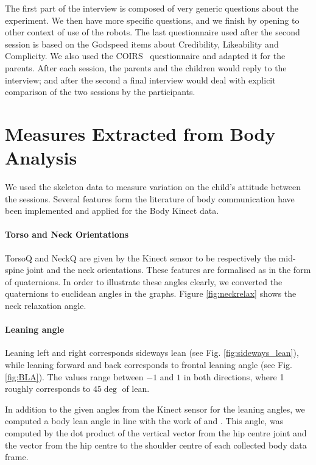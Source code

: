 \documentclass[a4paper,twocolumn]{svjour3}
\begin{document}
The first part of the interview is composed of very generic questions about the experiment. 
We then have more specific questions, and we finish by opening to other context of use of the robots.
The last questionnaire used after the second session is based on the Godspeed\cite{Bartneck2008b} items about Credibility, Likeability and Complicity. 
We also used the COIRS~\cite{Robert2014} questionnaire and adapted it for the parents.
After each session, the parents and the children would reply to the interview; and after the second a final interview would deal with explicit comparison of the two sessions by the participants.

\section{Measures Extracted from Body Analysis}
We used the skeleton data to measure variation on the child's attitude between the sessions.
Several features form the literature of body communication have been implemented and applied for the Body Kinect data.


\paragraph{Torso and Neck Orientations}
TorsoQ and NeckQ are given by the Kinect sensor to be respectively the mid-spine joint and the neck orientations. 
These features are formalised as in the form of quaternions. 
In order to illustrate  these angles clearly, we converted the quaternions to euclidean angles in the graphs.
Figure \ref{fig:neckrelax} shows the neck relaxation angle.

\paragraph{Leaning angle}
Leaning left and right corresponds sideways lean (see Fig. \ref{fig:sideways_lean}), while leaning forward and back corresponds to frontal leaning angle (see Fig. \ref{fig:BLA}). 
The values range between $-1$ and $1$ in both directions, where 1 roughly corresponds to $45\deg$ of lean.

In addition to the given angles from the Kinect sensor for the leaning angles, we computed a body lean angle in line with the work of \cite{Castellano} and \cite{Schegloff}. This angle, was computed by the dot product of the vertical vector from the hip centre joint and the vector from the hip centre to the shoulder centre of each collected body data frame. 
\end{document}
